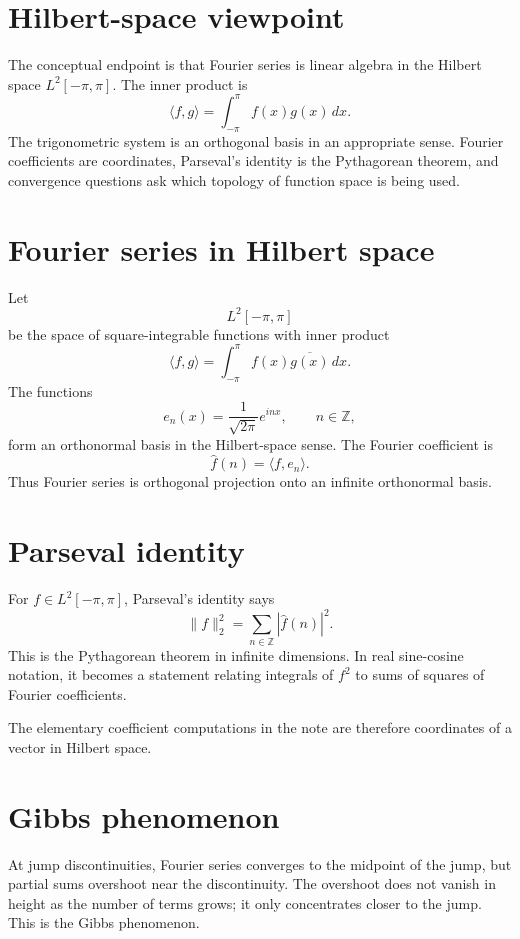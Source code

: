 \section{Hilbert-space viewpoint}

The conceptual endpoint is that Fourier series is linear algebra in the Hilbert space $L^2[-\pi,\pi]$.  The inner product is
\[
  \langle f,g\rangle=\int_{-\pi}^{\pi}f(x)g(x)\,dx.
\]
The trigonometric system is an orthogonal basis in an appropriate sense.  Fourier coefficients are coordinates, Parseval's identity is the Pythagorean theorem, and convergence questions ask which topology of function space is being used.

\section{Fourier series in Hilbert space}

Let
\[
  L^2[-\pi,\pi]
\]
be the space of square-integrable functions with inner product
\[
  \langle f,g\rangle=\int_{-\pi}^{\pi}f(x)\overline{g(x)}\,dx.
\]
The functions
\[
  e_n(x)=\frac1{\sqrt{2\pi}}e^{inx},\qquad n\in\mathbb Z,
\]
form an orthonormal basis in the Hilbert-space sense.  The Fourier coefficient is
\[
  \widehat f(n)=\langle f,e_n\rangle.
\]
Thus Fourier series is orthogonal projection onto an infinite orthonormal basis.

\section{Parseval identity}

For $f\in L^2[-\pi,\pi]$, Parseval's identity says
\[
  \|f\|_2^2=\sum_{n\in\mathbb Z}|\widehat f(n)|^2.
\]
This is the Pythagorean theorem in infinite dimensions.  In real sine-cosine notation, it becomes a statement relating integrals of $f^2$ to sums of squares of Fourier coefficients.

The elementary coefficient computations in the note are therefore coordinates of a vector in Hilbert space.

\section{Gibbs phenomenon}

At jump discontinuities, Fourier series converges to the midpoint of the jump, but partial sums overshoot near the discontinuity.  The overshoot does not vanish in height as the number of terms grows; it only concentrates closer to the jump.  This is the Gibbs phenomenon.

